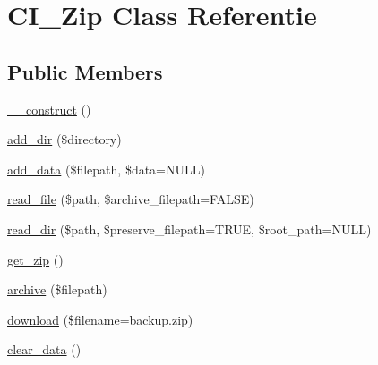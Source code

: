 \hypertarget{class_c_i___zip}{}\section{C\+I\+\_\+\+Zip Class Referentie}
\label{class_c_i___zip}
\subsection*{Public Members}
\begin{DoxyCompactItemize}
\item 
\mbox{\hyperlink{class_c_i___zip_a095c5d389db211932136b53f25f39685}{\+\_\+\+\_\+construct}} ()
\item 
\mbox{\hyperlink{class_c_i___zip_a86b6a309dad105e43b446dc9f8820703}{add\+\_\+dir}} (\$directory)
\item 
\mbox{\hyperlink{class_c_i___zip_a8d541e6609a5b2634a6a2bc7731465a5}{add\+\_\+data}} (\$filepath, \$data=N\+U\+LL)
\item 
\mbox{\hyperlink{class_c_i___zip_aa43eef46a052a3aff7a2ff0bf5c21c75}{read\+\_\+file}} (\$path, \$archive\+\_\+filepath=F\+A\+L\+SE)
\item 
\mbox{\hyperlink{class_c_i___zip_a296847a86d7cf0e4bba9b71a173cfffe}{read\+\_\+dir}} (\$path, \$preserve\+\_\+filepath=T\+R\+UE, \$root\+\_\+path=N\+U\+LL)
\item 
\mbox{\hyperlink{class_c_i___zip_a263fd906f99ccca15a12fe34a79656e4}{get\+\_\+zip}} ()
\item 
\mbox{\hyperlink{class_c_i___zip_a935879d7074c751a4ac886aebd66cbd4}{archive}} (\$filepath)
\item 
\mbox{\hyperlink{class_c_i___zip_ad4263f6c296942842ae25a94053c5f16}{download}} (\$filename=\textquotesingle{}backup.\+zip\textquotesingle{})
\item 
\mbox{\hyperlink{class_c_i___zip_a89d046bac0ab06a81c5c03d55b4bcae5}{clear\+\_\+data}} ()
\end{DoxyCompactItemize}

